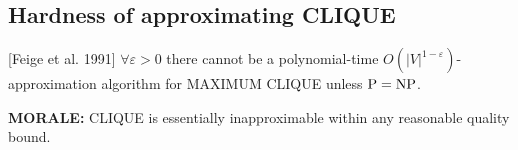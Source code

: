 \subsection{Hardness of approximating CLIQUE}
[Feige et al. 1991] $\forall\varepsilon>0$ there cannot be a polynomial-time $O(|V|^{1-\varepsilon})$-approximation algorithm for MAXIMUM CLIQUE unless $\mathrm{P}=\mathrm{NP}$.

\textbf{MORALE:} CLIQUE is essentially inapproximable within any reasonable quality bound.
